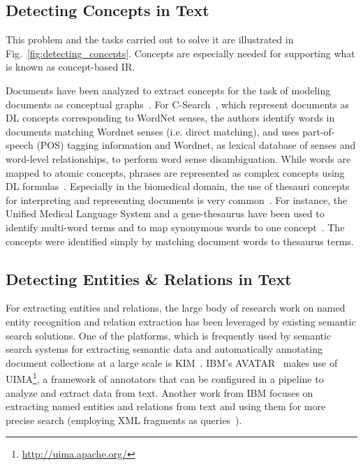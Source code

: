 \subsection{Detecting Concepts in Text} This problem and the tasks carried out to solve it are illustrated in Fig.~\ref{fig:detecting_concepts}. Concepts are especially needed for supporting what is known as concept-based IR. 

Documents have been analyzed to extract concepts for the task of modeling documents as conceptual graphs~\cite{DBLP:conf/iccs/ComparotHH07}. For C-Search~\cite{DBLP:conf/esws/GiunchigliaKZ09}, which represent documents as DL concepts corresponding to WordNet senses, the authors identify words in documents matching Wordnet senses (i.e. direct matching), and uses part-of-speech (POS) tagging information and Wordnet, as lexical database of senses and word-level relationships, to perform word sense disambiguation. While words are mapped to atomic concepts, phrases are represented as complex concepts using DL formulas~\cite{DBLP:conf/esws/GiunchigliaKZ09}. Especially in the biomedical domain, the use of thesauri concepts for interpreting and representing documents is very common~\cite{DBLP:conf/trec/TrieschniggKS06,DBLP:conf/trec/ZhouYTS06}. For instance, the Unified Medical Language System and a gene-thesaurus have been used to identify multi-word terms and to map synonymous words to one concept~\cite{DBLP:conf/trec/TrieschniggKS06}. The concepts were identified simply by matching document words to thesaurus terms.
	
	
\subsection{Detecting Entities \& Relations in Text} For extracting entities and relations, the large body of research work on named entity recognition and relation extraction has been leveraged by existing semantic search solutions. One of the platforms, which is frequently used by semantic search systems for extracting semantic data and
automatically annotating document collections at a large scale is KIM~\cite{KIM DBLP:journals/ws/KiryakovPTMO04}. IBM's AVATAR~\cite{DBLP:conf/sigmod/KandoganKRVZ06} makes use of UIMA\footnote{\url{http://uima.apache.org/}}, a framework of annotators that can be configured in a pipeline to analyze and extract data from text. Another work from IBM focuses on extracting named entities and relations from text and using them for more precise search (employing XML fragments as queries~\cite{DBLP:conf/sigir/Chu-CarrollPCFD06,DBLP:conf/cikm/Chu-CarrollP07}).

